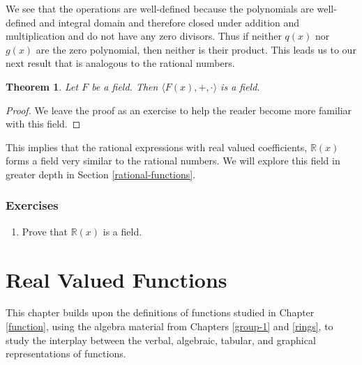 \documentclass[
]{book}
\providecommand{\tightlist}{%
  \setlength{\itemsep}{0pt}\setlength{\parskip}{0pt}}
\newtheorem{theorem}{Theorem}[chapter]
\theoremstyle{definition}
\theoremstyle{definition}
\theoremstyle{definition}
\theoremstyle{definition}
\theoremstyle{remark}
\begin{document}
We see that the operations are well-defined because the polynomials are well-defined and integral domain and therefore closed under addition and multiplication and do not have any zero divisors. Thus if neither \(q(x)\) nor \(g(x)\) are the zero polynomial, then neither is their product. This leads us to our next result that is analogous to the rational numbers.

\begin{theorem}
Let \(F\) be a field. Then \(\langle F(x),+,\cdot \rangle\) is a field.
\end{theorem}

\begin{proof}
We leave the proof as an exercise to help the reader become more familiar with this field.
\end{proof}

This implies that the rational expressions with real valued coefficients, \(\mathbb{R}(x)\) forms a field very similar to the rational numbers. We will explore this field in greater depth in Section \ref{rational-functions}.

\hypertarget{exercises-27}{%
\subsection{Exercises}\label{exercises-27}}

\begin{enumerate}
\def\labelenumi{\arabic{enumi}.}
\tightlist
\item
  Prove that \(\mathbb{R}(x)\) is a field.
\end{enumerate}

\hypertarget{real-valued-functions}{%
\chapter{Real Valued Functions}\label{real-valued-functions}}

This chapter builds upon the definitions of functions studied in Chapter \ref{function}, using the algebra material from Chapters \ref{group-1} and \ref{rings}, to study the interplay between the verbal, algebraic, tabular, and graphical representations of functions.
\end{document}
